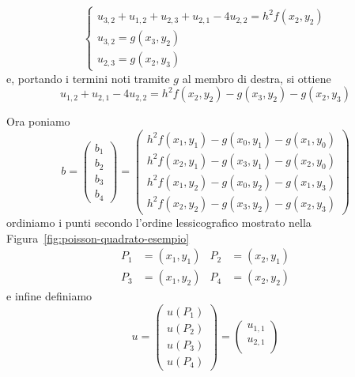 \begin{esempio}
\begin{description}
			\begin{equation*}
				\begin{cases*}
					u_{3, 2} + u_{1, 2} + u_{2, 3} + u_{2, 1} - 4 u_{2, 2} = h^2 f (x_2, y_2) \\
					u_{3, 2} = g (x_3, y_2) \\
					u_{2, 3} = g (x_2, y_3)
				\end{cases*}
			\end{equation*}
			e, portando i termini noti tramite \(g\) al membro di destra, si ottiene
			\begin{equation*}
				u_{1, 2} + u_{2, 1} - 4 u_{2, 2} = h^2 f (x_2, y_2) - g (x_3, y_2) - g (x_2, y_3)
			\end{equation*}
		\end{description}
	
		Ora poniamo
		\begin{equation*}
			b =
			\begin{pmatrix}
				b_1 \\
				b_2 \\
				b_3 \\
				b_4
			\end{pmatrix}
			=
			\begin{pmatrix}
				h^2 f (x_1, y_1) - g (x_0, y_1) - g (x_1, y_0) \\
				h^2 f (x_2, y_1) - g (x_3, y_1) - g (x_2, y_0) \\
				h^2 f (x_1, y_2) - g (x_0, y_2) - g (x_1, y_3) \\
				h^2 f (x_2, y_2) - g (x_3, y_2) - g (x_2, y_3)
			\end{pmatrix}
		\end{equation*}
		ordiniamo i punti secondo l'ordine lessicografico mostrato nella Figura~\ref{fig:poisson-quadrato-esempio}
		\begin{align*}
			P_1 &= (x_1, y_1) &
			P_2 &= (x_2, y_1) \\
			P_3 &= (x_1, y_2) &
			P_4 &= (x_2, y_2)
		\end{align*}
		e infine definiamo
		\begin{equation*}
			u =
			\begin{pmatrix}
				u (P_1) \\
				u (P_2) \\
				u (P_3) \\
				u (P_4)
			\end{pmatrix}
			=
			\begin{pmatrix}
				u_{1, 1} \\
				u_{2, 1} \\

\end{pmatrix}
\end{equation*}
\end{esempio}

